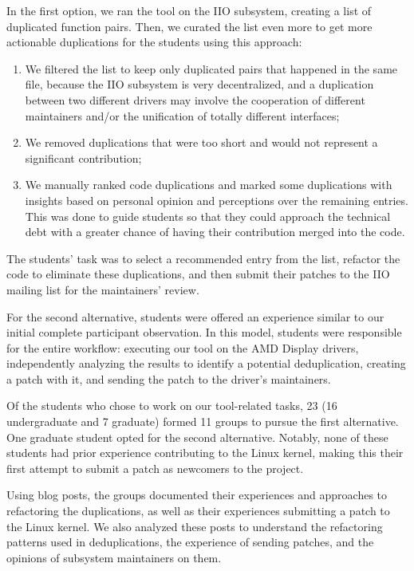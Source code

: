 \documentclass[10pt,conference]{IEEEtran}
\begin{document}
In the first option, we ran the tool on the IIO subsystem, creating a list of duplicated function pairs. Then, we curated the list even more to get more actionable duplications for the students using this approach:

\begin{enumerate}
    \item We filtered the list to keep only duplicated pairs that happened in the same file, because the IIO subsystem is very decentralized, and a duplication between two different drivers may involve the cooperation of different maintainers and/or the unification of totally different interfaces;
    \item We removed duplications that were too short and would not represent a significant contribution;
    \item We manually ranked code duplications and marked some duplications with insights based on personal opinion and perceptions over the remaining entries. This was done to guide students so that they could approach the technical debt with a greater chance of having their contribution merged into the code.
\end{enumerate}

The students' task was to select a recommended entry from the list, refactor the code to eliminate these duplications, and then submit their patches to the IIO mailing list for the maintainers' review.

For the second alternative, students were offered an experience similar to our initial complete participant observation. In this model, students were responsible for the entire workflow: executing our tool on the AMD Display drivers, independently analyzing the results to identify a potential deduplication, creating a patch with it, and sending the patch to the driver's maintainers.

Of the students who chose to work on our tool-related tasks, 23 (16 undergraduate and 7 graduate) formed 11 groups to pursue the first alternative. One graduate student opted for the second alternative. Notably, none of these students had prior experience contributing to the Linux kernel, making this their first attempt to submit a patch as newcomers to the project.

Using blog posts, the groups documented their experiences and approaches to refactoring the duplications, as well as their experiences submitting a patch to the Linux kernel. We also analyzed these posts to understand the refactoring patterns used in deduplications, the experience of sending patches, and the opinions of subsystem maintainers on them.
\end{document}
